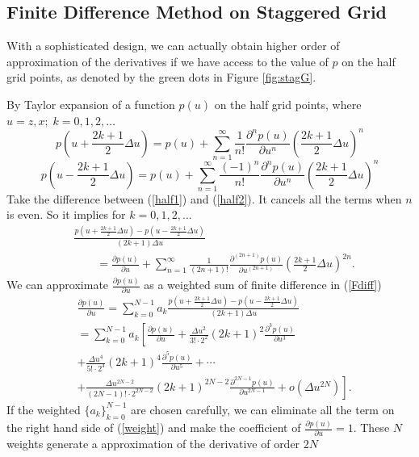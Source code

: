 \documentclass[12pt]{article}
\theoremstyle{plain}
\theoremstyle{definition}
\theoremstyle{remark}
\numberwithin{equation}{section}
\begin{document}
\subsection{Finite Difference Method on Staggered Grid}
With a sophisticated design, we can actually obtain higher order of approximation of the derivatives if we have access to the value of $p$ on the half grid points, as denoted by the green dots in Figure \ref{fig:stagG}. 

By Taylor expansion of a function $p(u)$ on the half grid points, where $u = z, x; \; k = 0, 1, 2, \dots $
  \begin{equation}\label{half1}
      p\left(u + \frac{2k+1}{2}\Delta u\right) = p(u) + \sum\limits_{n=1}^{\infty} \frac{1}{n!}\frac{\partial^n p(u)}{\partial u^n}\left(\frac{2k+1}{2}\Delta u\right)^n 
      \end{equation}
      \begin{equation}\label{half2}
      p\left(u - \frac{2k+1}{2}\Delta u\right) = p(u) + \sum\limits_{n=1}^{\infty} \frac{(-1)^n}{n!}\frac{\partial^n p(u)}{\partial u^n}\left(\frac{2k+1}{2}\Delta u\right)^n
  \end{equation}
  Take the difference between (\ref{half1}) and (\ref{half2}). It cancels all the terms when $n$ is even.
So it implies for $k = 0, 1, 2, \dots$
\begin{equation}    \label{Fdiff}
    \begin{aligned}
   &  \frac{p\left(u + \frac{2k+1}{2}\Delta u\right) - p\left(u - \frac{2k+1}{2}\Delta u\right)}{(2k+1)\Delta u}\\
    &~~~~~~~~~  =  \frac{\partial p(u)}{\partial u} + \sum\limits_{n=1 }^{\infty} \frac{1}{(2n+1)!}\frac{\partial^{(2n+1)} p(u)}{\partial u^{(2n+1)}}\left(\frac{2k+1}{2}\Delta u\right)^{2n}.
    \end{aligned}
    \end{equation}
We can approximate $\frac{\partial p(u)}{\partial u}$ as a weighted sum of finite difference in (\ref{Fdiff})
  \begin{equation}\label{weight}
  \begin{aligned}
    &\frac{\partial p(u)}{\partial u} = \sum\limits_{k=0}^{N-1} a_k \frac{p\left(u + \frac{2k+1}{2}\Delta u\right) - p\left(u - \frac{2k+1}{2}\Delta u\right)}{(2k+1)\Delta u} \\
    &= \sum\limits_{k=0}^{N-1} a_k \left[ \frac{\partial p(u)}{\partial u} + \frac{\Delta u^2}{3! \cdot 2^2}(2k+1)^2\frac{\partial^3 p(u)}{\partial u^3} \right.\\&\left. + \frac{\Delta u^4}{5! \cdot 2^4}(2k+1)^4\frac{\partial^5 p(u)}{\partial u^5} + \cdots \right.\\&\left. + \frac{\Delta u^{2N-2}}{(2N-1)! \cdot 2^{2N-2}}(2k+1)^{2N-2}\frac{\partial^{2N-1} p(u)}{\partial u^{2N-1}} + o(\Delta u^{2N}) \right].
  \end{aligned}
  \end{equation}
If the weighted $\{ a_k\}_{k=0}^{N-1}$ are chosen carefully, we can eliminate all the term on the right hand side of (\ref{weight}) and make the coefficient of $\frac{\partial p(u)}{\partial u} =1$. These $N$ weights generate a approximation of the derivative of order $2N$ 
\end{document}
